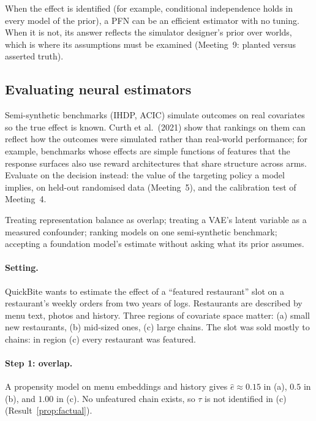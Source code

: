 \documentclass[11pt]{article}
\begin{document}
When the effect is identified (for example, conditional independence holds in every model of the prior), a PFN can
be an efficient estimator with no tuning. When it is not, its answer reflects the simulator designer's prior over
worlds, which is where its assumptions must be examined (Meeting~9: planted versus asserted truth).

\subsection{Evaluating neural estimators}

Semi-synthetic benchmarks (IHDP, ACIC) simulate outcomes on real covariates so the true effect is known. Curth et al.\
(2021) show that rankings on them can reflect how the outcomes were simulated rather than real-world performance; for
example, benchmarks whose effects are simple functions of features that the response surfaces also use reward
architectures that share structure across arms. Evaluate on the decision instead: the value of the targeting policy a
model implies, on held-out randomised data (Meeting~5), and the calibration test of Meeting~4.

\begin{pitfall}
Treating representation balance as overlap; treating a VAE's latent variable as a measured confounder; ranking models
on one semi-synthetic benchmark; accepting a foundation model's estimate without asking what its prior assumes.
\end{pitfall}

\sectiontwo

\paragraph{Setting.} QuickBite wants to estimate the effect of a ``featured restaurant'' slot on a restaurant's weekly
orders from two years of logs. Restaurants are described by menu text, photos and history. Three regions of covariate
space matter: (a) small new restaurants, (b) mid-sized ones, (c) large chains. The slot was sold mostly to chains: in
region (c) every restaurant was featured.

\paragraph{Step 1: overlap.} A propensity model on menu embeddings and history gives $\hat e \approx 0.15$ in (a), $0.5$ in
(b), and $1.00$ in (c). No unfeatured chain exists, so $\tau$ is not identified in (c) (Result~\ref{prop:factual}).
\end{document}
